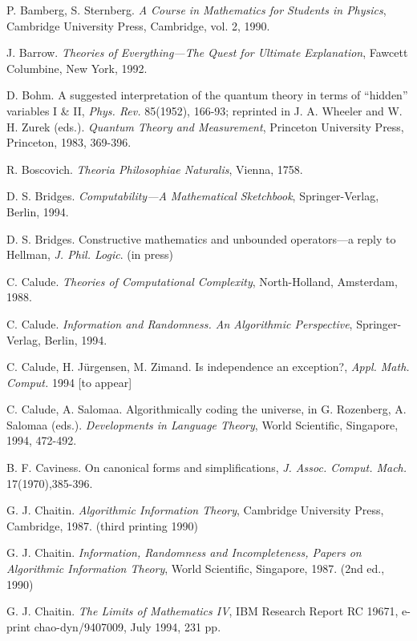         \begin{thebibliography}{99999}


 P. Bamberg, S. Sternberg. {\it A Course in Mathematics for
Students in Physics},  Cambridge University Press, Cambridge, vol. 2, 1990.

J. Barrow. {\it Theories of Everything---The Quest for Ultimate Explanation},
Fawcett Columbine, New York, 1992.

D. Bohm. A suggested interpretation of the quantum theory in terms of
``hidden'' variables I \& II, {\it Phys. Rev.} 85(1952), 166-93;
reprinted in
 J. A. Wheeler and W. H. Zurek (eds.).  {\it
 Quantum Theory and Measurement},
 Princeton University Press, Princeton, 1983, 369-396.


 R. Boscovich. {\it Theoria Philosophiae Naturalis},
Vienna, 1758.

D. S. Bridges. {\em Computability---A Mathematical Sketchbook},
Springer-Verlag, Berlin, 1994.

D. S. Bridges. Constructive mathematics and unbounded operators---a reply
to Hellman,
{\it J. Phil. Logic}. (in press)

C. Calude. {\em Theories of Computational Complexity}, North-Holland,
Amsterdam,  1988.

 C. Calude. {\it Information and Randomness. An Algorithmic
Perspective},
Springer-Verlag, Berlin, 1994.

C. Calude, H. J\"{u}rgensen, M. Zimand. Is independence an exception?, {\em
Appl. Math. Comput.} 1994  [to appear]

 C. Calude, A. Salomaa.  Algorithmically coding the
universe, in G. Rozenberg,
A. Salomaa (eds.). {\em Developments in Language Theory}, World Scientific,
Singapore, 1994, 472-492.

B. F. Caviness. On canonical forms and simplifications,
{\it J. Assoc. Comput. Mach.} 17(1970),385-396.

G. J. Chaitin. {\em Algorithmic Information Theory},
Cambridge University Press, Cambridge,  1987. (third printing 1990)

G. J. Chaitin.  {\em Information, Randomness and
Incompleteness,
Papers on Algorithmic Information Theory},
World
Scientific, Singapore,  1987. (2nd ed., 1990)

G. J. Chaitin. {\it The Limits of Mathematics IV}, IBM Research Report RC
19671, e-print chao-dyn/9407009, July 1994, 231 pp.



\end{thebibliography}
